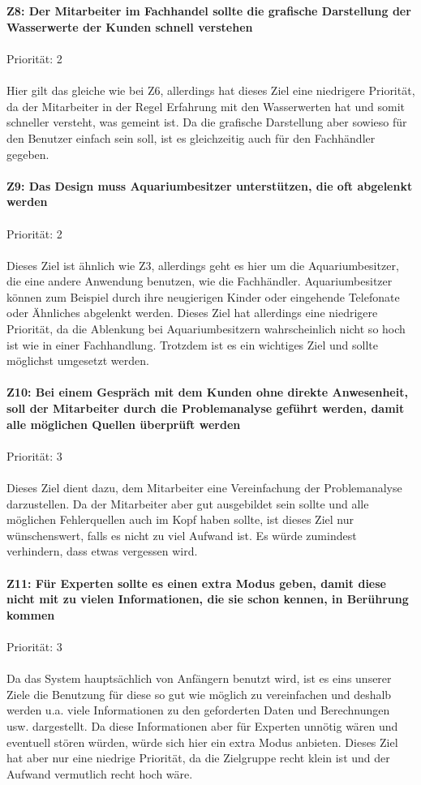 \\ \\
\textbf{Z8: Der Mitarbeiter im Fachhandel sollte die grafische Darstellung der Wasserwerte der Kunden schnell verstehen}
\\ \\
Priorität: 2
\\ \\
Hier gilt das gleiche wie bei Z6, allerdings hat dieses Ziel eine niedrigere Priorität, da der Mitarbeiter in der Regel Erfahrung mit den Wasserwerten hat und somit schneller versteht, was gemeint ist. Da die grafische Darstellung aber sowieso für den Benutzer einfach sein soll, ist es gleichzeitig auch für den Fachhändler gegeben.
\\ \\
\textbf{Z9: Das Design muss Aquariumbesitzer unterstützen, die oft abgelenkt werden}
\\ \\
Priorität: 2
\\ \\
Dieses Ziel ist ähnlich wie Z3, allerdings geht es hier um die Aquariumbesitzer, die eine andere Anwendung benutzen, wie die Fachhändler. Aquariumbesitzer können zum Beispiel durch ihre neugierigen Kinder oder eingehende Telefonate oder Ähnliches abgelenkt werden. Dieses Ziel hat allerdings eine niedrigere Priorität, da die Ablenkung bei Aquariumbesitzern wahrscheinlich nicht so hoch ist wie in einer Fachhandlung. Trotzdem ist es ein wichtiges Ziel und sollte möglichst umgesetzt werden.
\\ \\
\textbf{Z10: Bei einem Gespräch mit dem Kunden ohne direkte Anwesenheit, soll der Mitarbeiter durch die Problemanalyse geführt werden, damit alle möglichen Quellen überprüft werden}
\\ \\
Priorität: 3
\\ \\
Dieses Ziel dient dazu, dem Mitarbeiter eine Vereinfachung der Problemanalyse darzustellen. Da der Mitarbeiter aber gut ausgebildet sein sollte und alle möglichen Fehlerquellen auch im Kopf haben sollte, ist dieses Ziel nur wünschenswert, falls es nicht zu viel Aufwand ist. Es würde zumindest verhindern, dass etwas vergessen wird.
\\ \\
\textbf{Z11: Für Experten sollte es einen extra Modus geben, damit diese nicht mit zu vielen Informationen, die sie schon kennen, in Berührung kommen}
\\ \\
Priorität: 3
\\ \\
Da das System hauptsächlich von Anfängern benutzt wird, ist es eins unserer Ziele die Benutzung für diese so gut wie möglich zu vereinfachen und deshalb werden u.a. viele Informationen zu den geforderten Daten und Berechnungen usw. dargestellt. Da diese Informationen aber für Experten unnötig wären und eventuell stören würden, würde sich hier ein extra Modus anbieten. Dieses Ziel hat aber nur eine niedrige Priorität, da die Zielgruppe recht klein ist und der Aufwand vermutlich recht hoch wäre.

